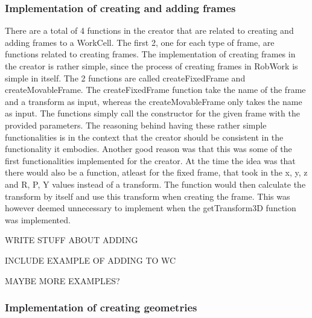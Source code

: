 \subsubsection{Implementation of creating and adding frames}
There are a total of 4 functions in the creator that are related to creating and adding frames to a WorkCell. The first 2, one for each type of frame, are functions related to creating frames. The implementation of creating frames in the creator is rather simple, since the process of creating frames in RobWork is simple in itself. The 2 functions are called createFixedFrame and createMovableFrame. The createFixedFrame function take the name of the frame and a transform as input, whereas the createMovableFrame only takes the name as input. The functions simply call the constructor for the given frame with the provided parameters. The reasoning behind having these rather simple functionalities is in the context that the creator should be consistent in the functionality it embodies. Another good reason was that this was some of the first functionalities implemented for the creator. At the time the idea was that there would also be a function, atleast for the fixed frame, that took in the x, y, z and R, P, Y values instead of a transform. The function would then calculate the transform by itself and use this transform when creating the frame. This was however deemed unnecessary to implement when the getTransform3D function was implemented.

WRITE STUFF ABOUT ADDING

INCLUDE EXAMPLE OF ADDING TO WC

MAYBE MORE EXAMPLES?

\subsubsection{Implementation of creating geometries}
